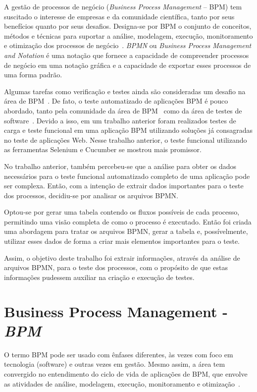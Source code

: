 \documentclass[12pt]{article}
\begin{document}
A gestão de processos de negócio (\emph{Business Process Management} -- BPM) tem suscitado o interesse de empresas e da comunidade científica, tanto por seus benefícios quanto por seus desafios. Designa-se por BPM o conjunto de conceitos, métodos e técnicas para suportar a análise, modelagem, execução, monitoramento e otimização dos processos de negócio~\cite{weske}. \emph{BPMN} ou \emph{Business Process Management and Notation} é uma notação que fornece a capacidade de compreender processos de negócio em uma notação gráfica e a capacidade de exportar esses processos de uma forma padrão\cite{bpmn}.

Algumas tarefas como verificação e testes ainda são consideradas um desafio na área de BPM~\cite{aalst2013survey}. De fato, o teste automatizado de aplicações BPM é pouco abordado, tanto pela comunidade da área de BPM~\cite{weske} como da área de testes de software~\cite{graham2012experiences}. Devido a isso, em um trabalho anterior \cite{sbqs2015} foram realizados testes de carga e teste funcional em uma aplicação BPM utilizando soluções já consagradas no teste de aplicações Web. Nesse trabalho anterior, o teste funcional utilizando as ferramentas Selenium e Cucumber se mostrou mais promissor.

No trabalho anterior, também percebeu-se que a análise para obter os dados necessários para o teste funcional automatizado completo de uma aplicação pode ser complexa. Então, com a intenção de extrair dados importantes para o teste dos processos, decidiu-se por analisar os arquivos BPMN. 

Optou-se por gerar uma tabela contendo os fluxos possíveis de cada processo, permitindo uma visão completa de como o processo é executado. Então foi criada uma abordagem para tratar os arquivos BPMN, gerar a tabela e, possívelmente, utilizar esses dados de forma a criar mais elementos importantes para o teste.

Assim, o objetivo deste trabalho foi extrair informações, através da análise de arquivos BPMN, para o teste dos processos, com o propósito de que estas informações pudessem auxiliar na criação e execução de testes. 

\section{Business Process Management - \emph{BPM}}

O termo BPM pode ser usado com ênfases diferentes, às vezes com foco em tecnologia (software) e outras vezes em gestão. Mesmo assim, a área tem convergido no entendimento do ciclo de vida de aplicações de BPM, que envolve as atividades de análise, modelagem, execução, monitoramento e otimização~\cite{ABPMP}. 
\end{document}
